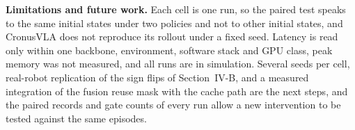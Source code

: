 \documentclass[letterpaper, 10 pt, conference]{ieeeconf}
\begin{document}
\textbf{Limitations and future work.} Each cell is one run, so the paired
test speaks to the same initial states under two policies and not to other
initial states, and CronusVLA does not reproduce its rollout under a fixed
seed. Latency is read only within one backbone, environment, software stack
and GPU class, peak memory was not measured, and all runs are in
simulation. Several seeds per cell, real-robot replication of the sign
flips of Section~IV-B, and a measured integration of the fusion reuse mask
with the cache path are the next steps, and the paired records and gate
counts of every run allow a new intervention to be tested against the same
episodes.



\end{document}
